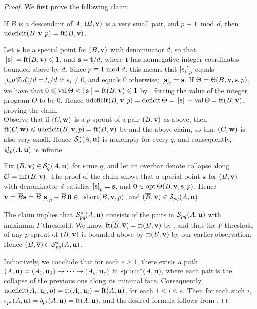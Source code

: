 \documentclass{amsart}
\begin{document}
\begin{proof}
We first prove the following claim:

\begin{claim}
   If $B$ is a descendant of $A$, $(B, \mathbf{v})$ is a very small pair, and $p \equiv 1 \bmod d$, then $\operatorname{udeficit}(B, \mathbf{v}, p) = \operatorname{ft}(B, \mathbf{v})$.
\end{claim}

Let $\mathbf{s}$ be a special point for $(B, \mathbf{v})$ with denominator $d$, so that $\| \mathbf{s} \| = \operatorname{ft}(B, \mathbf{v}) \leqslant 1$, and $\mathbf{s} = \mathbf{t}/d$, where $\mathbf{t}$ has nonnegative integer coordinates bounded above by $d$.
Since $p \equiv 1 \bmod d$, this means that $\left[ s_i \right]_p$ equals $[ \hspace{.01in} t_i p \, \% \, d \hspace{.01in} ]/d = t_i/d$ if $s_i \neq 0$, and equals $0$ otherwise; \ie $\left[ \mathbf{s} \right]_p = \mathbf{s}$.
If $\Theta = \Theta(B, \mathbf{v}, \mathbf{s}, p)$, we have that $0 \leqslant \operatorname{val} \Theta < \| \mathbf{s} \| = \operatorname{ft}(B, \mathbf{v}) \leqslant 1$  by , forcing the value of the integer program $\Theta$ to be $0$.
Hence $\operatorname{udeficit}(B, \mathbf{v}, p) = \operatorname{deficit} \Theta = \| \mathbf{s} \| - \operatorname{val}\Theta = \operatorname{ft}(B, \mathbf{v})$, proving the claim.\\[2mm]
Observe that if $(C, \mathbf{w})$ is a $p$-sprout of a pair $(B, \mathbf{v})$ as above, then $\operatorname{ft}(C, \mathbf{w}) \leqslant \operatorname{udeficit}(B, \mathbf{v}, p) = \operatorname{ft}(B, \mathbf{v})$ by  and the above claim, so that $(C, \mathbf{w})$ is also very small.
Hence $\mathcal{S}^\ast_{q}(A, \mathbf{u})$ is nonempty for every $q$, and consequently, $\mathcal{Q}_p(A,\mathbf{u})$ is infinite.

Fix $(B, \mathbf{v}) \in \mathcal{S}_{q}^\ast(A,\mathbf{u})$ for some $q$, and let an overbar denote collapse along $\mathcal{O} = \operatorname{mf}(B, \mathbf{v})$.
The proof of the claim shows that a special point $\mathbf{s}$ for $(B,\mathbf{v})$ with denominator $d$ satisfies $\left[ \mathbf{s} \right]_p = \mathbf{s}$, and $\mathbf{0} \in \operatorname{opt} \Theta(B,\mathbf{v},\mathbf{s},p)$.
Hence $\overline{\mathbf{v}} = \overline{B}\mathbf{s} = \overline{B}\left[ \mathbf{s} \right]_p - \overline{B} \, \mathbf{0} \in \operatorname{ushort}(B, \mathbf{v}, p)$, and $(\overline{B}, \overline{\mathbf{v}}) \in \mathcal{S}_{pq}(A, \mathbf{u})$.

The claim implies that $\mathcal{S}^\ast_{pq}(A, \mathbf{u})$ consists of the pairs in $\mathcal{S}_{pq}(A, \mathbf{u})$ with maximum $F$-threshold.
We know $\operatorname{ft}(\overline{B}, \overline{\mathbf{v}}) = \operatorname{ft}(B, \mathbf{v})$ by , and
that the $F$-threshold of any $p$-sprout of $(B, \mathbf{v})$ is bounded above by $\operatorname{ft}(B, \mathbf{v})$ by our earlier observation.
Hence $(\overline{B}, \overline{\mathbf{v}}) \in \mathcal{S}^\ast_{pq}(A, \mathbf{u})$.

Inductively, we conclude that for each $e\ge 1$, there exists a path $(A,\mathbf{u}) = (A_1,\mathbf{u}_1) \to \cdots \to (A_e,\mathbf{u}_e)$ in $\operatorname{sprout}^*(A,\mathbf{u})$, where each pair is the collapse of the previous one along its minimal face.
Consequently, $\operatorname{udeficit}(A_i,\mathbf{u}_i,p) = \operatorname{ft}(A_i, \mathbf{u}_i) = \operatorname{ft}(A, \mathbf{u})$, for each $1\le i \le e$.
Then for each such $i$, $\epsilon_{p^i}(A,\mathbf{u}) = \delta_{p^i}(A,\mathbf{u}) = \operatorname{ft}(A, \mathbf{u})$, and the desired formula follows from
.
\end{proof}
\end{document}
